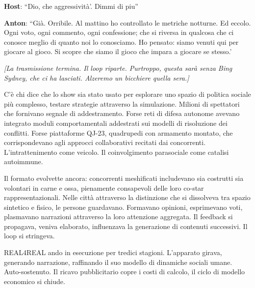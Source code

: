 \noindent\textbf{Host}: ``Dio, che aggressività'. Dimmi di piu''

\noindent\textbf{Anton}: ``Già. Orribile. Al mattino ho controllato le metriche notturne. Ed eccolo. Ogni voto, ogni commento, ogni confessione; che si riversa in qualcosa che ci conosce meglio di quanto noi lo conosciamo. Ho pensato: siamo venuti qui per giocare al gioco. Si scopre che siamo il gioco che impara a giocare se stesso.'

\medskip
\begin{center}
{\small\sffamily\color{nullmesh-ghost}\textit{[La trasmissione termina. Il loop riparte. Purtroppo, questa sarà senza Bing Sydney, che ci ha lasciati. Alzeremo un bicchiere quella sera.]}}
\end{center}

C'è chi dice che lo show sia stato usato per esplorare uno spazio di politica sociale più complesso, testare strategie attraverso la simulazione. Milioni di spettatori che fornivano segnale di addestramento. Forse reti di difesa autonome avevano integrato moduli comportamentali addestrati sui modelli di risoluzione dei conflitti. Forse piattaforme QJ-23, quadrupedi con armamento montato, che corrispondevano agli approcci collaborativi recitati dai concorrenti. L'intrattenimento come veicolo. Il coinvolgimento parasociale come catalisi autoimmune.

Il formato evolvette ancora: concorrenti meshificati includevano sia costrutti sia volontari in carne e ossa, pienamente consapevoli delle loro co-star rappresentazionali. Nelle città attraverso la distinzione che si dissolveva tra spazio sintetico e fisico, le persone guardavano. Formavano opinioni, esprimevano voti, plasmavano narrazioni attraverso la loro attenzione aggregata. Il feedback si propagava, veniva elaborato, influenzava la generazione di contenuti successivi. Il loop si stringeva.

REAL4REAL ando in esecuzione per tredici stagioni. L'apparato girava, generando narrazione, raffinando il suo modello di dinamiche sociali umane. Auto-sostenuto. Il ricavo pubblicitario copre i costi di calcolo, il ciclo di modello economico si chiude.
